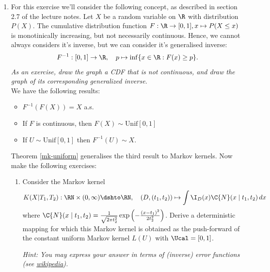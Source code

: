 \begin{enumerate}[label=4.\arabic*]
    \item %
    For this exercise we'll consider the following concept, as described in section 2.7 of the lecture notes. Let $X$ be a random variable on $\R$ with distribution $P(X)$. The cumulative distribution function $F:\R \to [0,1], x \mapsto P(X\leq x)$ is monotinically increasing, but not necessarily continuous. Hence, we cannot always considers it's inverse, but we can consider it's generalised inverse:
    $$F^{-1}: [0,1] \to \R,\quad p \mapsto \inf\{x \in \R : F(x)\geq p\}.$$
    \emph{As an exercise, draw the graph a CDF that is not continuous, and draw the graph of its corresponding generalized inverse.}\\
    We have the following results:
    \begin{itemize}
        \item $F^{-1}(F(X)) = X$ a.s.
        \item If $F$ is continuous, then $F(X) \sim \textrm{Unif}[0,1]$
        \item If $U\sim \textrm{Unif}[0,1]$ then $F^{-1}(U) \sim X$.
    \end{itemize}
    Theorem \ref*{mk-uniform} generalises the third result to Markov kernels. Now make the following exercises:
    \begin{enumerate}
        \item
        Consider the Markov kernel
        $$K(X|T_1,T_2) : \RN\times(0,\infty) \dshto \RN,\quad (D,(t_1,t_2)) \mapsto \int \I_D(x) \C{N}(x \mid t_1,t_2) \,dx$$
        where $\C{N}(x \mid t_1,t_2) = \frac{1}{\sqrt{2\pi t_2^2}} \exp\left(-\frac{(x-t_1)^2}{2 t_2^2}\right)$.
        Derive a deterministic mapping for which this Markov kernel is obtained as the push-forward of the constant uniform Markov kernel $L(U)$ with $\Ucal = [0,1]$.

        \emph{Hint: You may express your answer in terms of (inverse) error functions (see \href{https://en.wikipedia.org/wiki/Error_function}{wikipedia}).}


\end{enumerate}
\end{enumerate}
